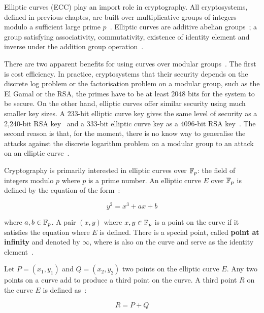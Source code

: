 Elliptic curves (ECC) play an import role in cryptography. All cryptosystems, defined in previous chaptes, are built over multiplicative groups of integers modulo a sufficient large prime $p$~\cite{kiagias:crypto, boneh_crypto}. Elliptic curves are additive abelian groups~\cite{kiagias:crypto}; a group satisfying associativity, commutativity, existence of identity element and inverse under the addition group operation~\cite{elliptic_curves_2}.

There are two apparent benefits for using curves over modular groups~\cite{kiagias:crypto}. The first is cost efficiency. In practice, cryptosystems that their security depends on the discrete log problem or the factorisation problem on a modular group, such as the El Gamal or the RSA, the primes have to be at least 2048 bits for the system to be secure. On the other hand, elliptic curves offer similar security using much smaller key sizes. A 233-bit elliptic curve key gives the same level of security as a 2,240-bit RSA key~\cite{ecc_rsa_bits, ecc_rsa_bits_1} and a 333-bit elliptic curve key as a 4096-bit RSA key~\cite{blake1999elliptic}. The second reason is that, for the moment, there is no know way to generalise the attacks against the discrete logarithm problem on a modular group to an attack on an elliptic curve~\cite{kiagias:crypto}.

Cryptography is primarily interested in elliptic curves over $\mathbb{F}_p$: the field of integers modulo $p$ where $p$ is a prime number. An elliptic curve $E$ over $\mathbb{F}_p$ is defined by the equation of the form~\cite{elliptic_curves, elliptic_curves_2}:

\begin{equation*}
  y^2 = x^3 + ax + b
\end{equation*}

where $a, b \in \mathbb{F}_p$. A pair $(x, y)$ where $x, y \in \mathbb{F}_p$ is a point on the curve if it satisfies the equation where $E$ is defined. There is a special point, called \textbf{point at infinity} and denoted by $\infty$, where is also on the curve and serve as the identity element~\cite{elliptic_curves_2}.

Let $P = (x_1, y_1)$ and $Q = (x_2, y_2)$ two points on the elliptic curve $E$. Any two points on a curve add to produce a third point on the curve. A third point $R$ on the curve $E$ is defined as~\cite{elliptic_curves}:

\begin{equation*}
  R = P + Q
\end{equation*}

